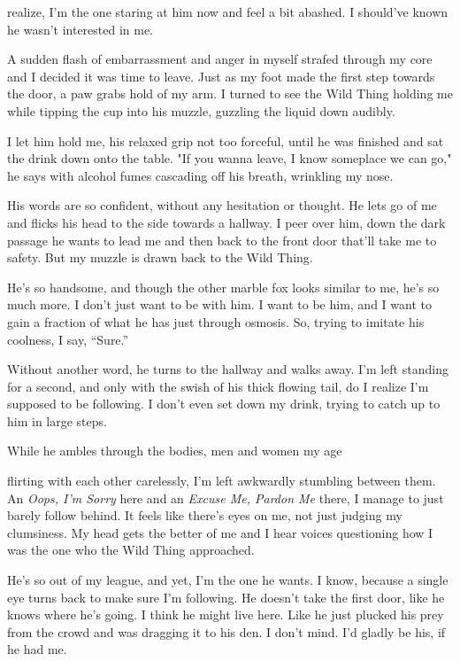 realize, I'm the one staring at him now and feel a bit abashed. I
should've known he wasn't interested in me.

A sudden flash of embarrassment and anger in myself strafed through my
core and I decided it was time to leave. Just as my foot made the first
step towards the door, a paw grabs hold of my arm. I turned to see the
Wild Thing holding me while tipping the cup into his muzzle, guzzling
the liquid down audibly.

I let him hold me, his relaxed grip not too forceful, until he was
finished and sat the drink down onto the table. "If you wanna leave, I
know someplace we can go," he says with alcohol fumes cascading off his
breath, wrinkling my nose.

His words are so confident, without any hesitation or thought. He lets
go of me and flicks his head to the side towards a hallway. I peer over
him, down the dark passage he wants to lead me and then back to the
front door that'll take me to safety. But my muzzle is drawn back to the
Wild Thing.

He's so handsome, and though the other marble fox looks similar to me,
he's so much more. I don't just want to be with him. I want to be him,
and I want to gain a fraction of what he has just through osmosis. So,
trying to imitate his coolness, I say, ``Sure.''

Without another word, he turns to the hallway and walks away. I'm left
standing for a second, and only with the swish of his thick flowing
tail, do I realize I'm supposed to be following. I don't even set down
my drink, trying to catch up to him in large steps.

While he ambles through the bodies, men and women my age

flirting with each other carelessly, I'm left awkwardly stumbling
between them. An \emph{Oops, I'm Sorry} here and an \emph{Excuse Me,
Pardon Me} there, I manage to just barely follow behind. It feels like
there's eyes on me, not just judging my clumsiness. My head gets the
better of me and I hear voices questioning how I was the one who the
Wild Thing approached.

He's so out of my league, and yet, I'm the one he wants. I know, because
a single eye turns back to make sure I'm following. He doesn't take the
first door, like he knows where he's going. I think he might live here.
Like he just plucked his prey from the crowd and was dragging it to his
den. I don't mind. I'd gladly be his, if he had me.

